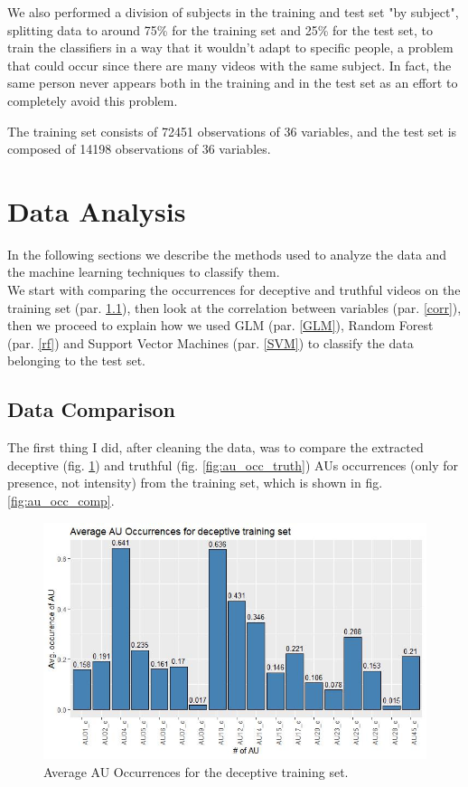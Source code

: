We also performed a division of subjects in the training and test set "by subject", splitting data to around 75\% for the training set and 25\% for the test set, to train the classifiers in a way that it wouldn't adapt to specific people, a problem that could occur since there are many videos with the same subject. In fact, the same person never appears both in the training and in the test set as an effort to completely avoid this problem.

The training set consists of 72451 observations of 36 variables, and the test set is composed of 14198 observations of 36 variables.

\clearpage

\section{Data Analysis} \label{data_an}
In the following sections we describe the methods used to analyze the data and the machine learning techniques to classify them. \\
We start with comparing the occurrences for deceptive and truthful videos on the training set (par. \ref{data_comp}), then look at the correlation between variables (par. \ref{corr}), then we proceed to explain how we used GLM (par. \ref{GLM}), Random Forest (par. \ref{rf}) and Support Vector Machines (par. \ref{SVM}) to classify the data belonging to the test set.

\subsection{Data Comparison} \label{data_comp}
The first thing I did, after cleaning the data, was to compare the extracted deceptive (fig. \ref{fig:au_occ_dec}) and truthful (fig. \ref{fig:au_occ_truth}) AUs occurrences (only for presence, not intensity) from the training set, which is shown in fig. \ref{fig:au_occ_comp}.

\begin{figure}[H]
	\centering
	\includegraphics[width=1\textwidth]{images/au_occ_dec}
	\caption{Average AU Occurrences for the deceptive training set.}
	\label{fig:au_occ_dec}
\end{figure}

